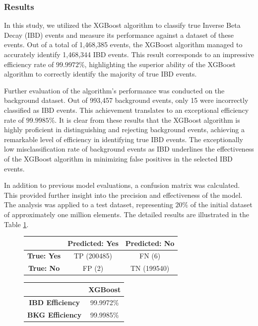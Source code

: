 \subsubsection{Results}
In this study, we utilized the XGBoost algorithm to classify true Inverse Beta Decay (IBD) events and measure its performance against a dataset of these events. Out of a total of 1,468,385 events, the XGBoost algorithm managed to accurately identify 1,468,344 IBD events. This result corresponds to an impressive efficiency rate of $99.9972\%$, highlighting the superior ability of the XGBoost algorithm to correctly identify the majority of true IBD events.

Further evaluation of the algorithm's performance was conducted on the background dataset. Out of 993,457 background events, only 15 were incorrectly classified as IBD events. This achievement translates to an exceptional efficiency rate of $99.9985\%$. It is clear from these results that the XGBoost algorithm is highly proficient in distinguishing and rejecting background events, achieving a remarkable level of efficiency in identifying true IBD events. The exceptionally low misclassification rate of background events as IBD underlines the effectiveness of the XGBoost algorithm in minimizing false positives in the selected IBD events. 


In addition to previous model evaluations, a confusion matrix was calculated. This provided further insight into the precision and effectiveness of the model. The analysis was applied to a test dataset, representing $20\%$ of the initial dataset of approximately one million elements. The detailed results are illustrated in the Table \ref{tab:conf_matrix_xgb}.


\begin{figure}[h]
	\centering
	\begin{minipage}{0.5\textwidth}
		\centering
		\begin{tabular}{|c|c|c|}
			\hline
			& \textbf{Predicted: Yes} & \textbf{Predicted: No} \\
			\hline\hline
			\textbf{True: Yes} & TP (200485) & FN (6) \\
			\hline
			\textbf{True: No} & FP (2) & TN (199540) \\
			\hline
		\end{tabular}
		\label{tab:conf_matrix_xgb}
	\end{minipage}\hfill
	\begin{minipage}{0.5\textwidth}
		\centering
		\begin{tabular}{|c|c|}
			\hline
			& \textbf{XGBoost} \\
			\hline\hline
			\textbf{IBD Efficiency} & 99.9972\% \\
			\hline
			\textbf{BKG Efficiency} & 99.9985\% \\
			\hline
		\end{tabular}
	\end{minipage}
\end{figure}

